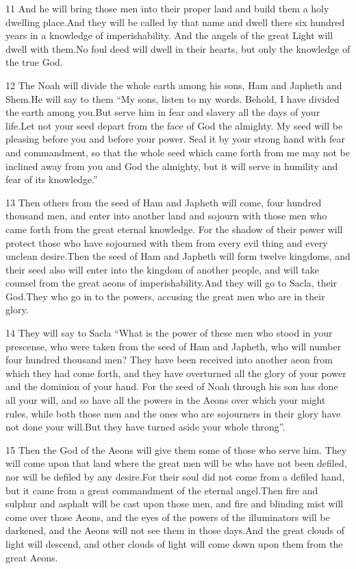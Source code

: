 \par 11 And he will bring those men into their proper land and build them a holy dwelling place.And they will be called by that name and dwell there six hundred years in a knowledge of imperishability. And the angels of the great Light will dwell with them.No foul deed will dwell in their hearts, but only the knowledge of the true God.

\par 12 The Noah will divide the whole earth among his sons, Ham and Japheth and Shem.He will say to them “My sons, listen to my words. Behold, I have divided the earth among you.But serve him in fear and slavery all the days of your life.Let not your seed depart from the face of God the almighty. My seed will be pleasing before you and before your power. Seal it by your strong hand with fear and commandment, so that the whole seed which came forth from me may not be inclined away from you and God the almighty, but it will serve in humility and fear of its knowledge.”

\par 13 Then others from the seed of Ham and Japheth will come, four hundred thousand men, and enter into another land and sojourn with those men who came forth from the great eternal knowledge. For the shadow of their power will protect those who have sojourned with them from every evil thing and every unclean desire.Then the seed of Ham and Japheth will form twelve kingdoms, and their seed also will enter into the kingdom of another people, and will take counsel from the great aeons of imperishability.And they will go to Sacla, their God.They who go in to the powers, accusing the great men who are in their glory.

\par 14 They will say to Sacla “What is the power of these men who stood in your prescense, who were taken from the seed of Ham and Japheth, who will number four hundred thousand men? They have been received into another aeon from which they had come forth, and they have overturned all the glory of your power and the dominion of your hand. For the seed of Noah through his son has done all your will, and so have all the powers in the Aeons over which your might rules, while both those men and the ones who are sojourners in their glory have not done your will.But they have turned aside your whole throng”.

\par 15 Then the God of the Aeons will give them some of those who serve him. They will come upon that land where the great men will be who have not been defiled, nor will be defiled by any desire.For their soul did not come from a defiled hand, but it came from a great commandment of the eternal angel.Then fire and sulphur and asphalt will be cast upon those men, and fire and blinding mist will come over those Aeons, and the eyes of the powers of the illuminators will be darkened, and the Aeons will not see them in those days.And the great clouds of light will descend, and other clouds of light will come down upon them from the great Aeons.


